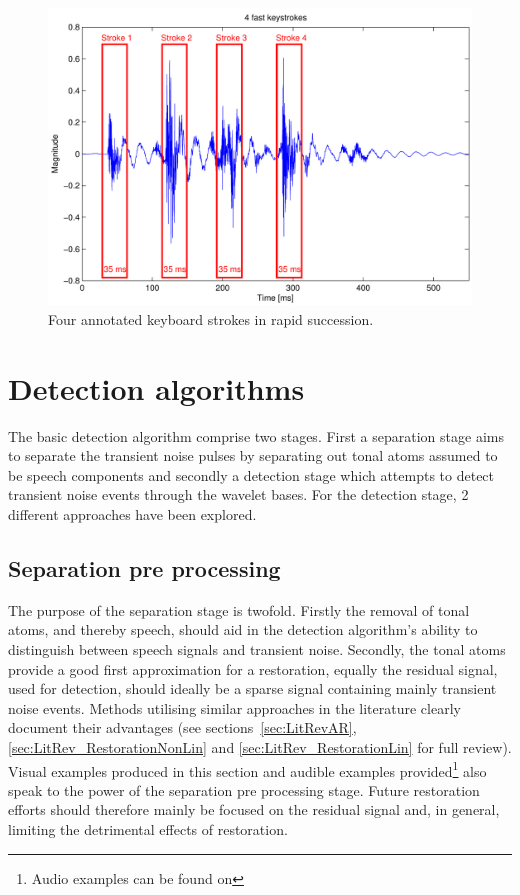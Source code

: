 \begin{figure}[!] %
\centering
\includegraphics[width=120mm]{Keyboard4StrokesFast.pdf}
\caption{Four annotated keyboard strokes in rapid succession.}\label{fig:Keyboard4StrokesFast}
\end{figure}

\section{Detection algorithms}\label{sec:WPdetection}
The basic detection algorithm comprise two stages. First a separation stage aims to separate the transient noise pulses by separating out tonal atoms assumed to be speech components and secondly a detection stage which attempts to detect transient noise events through the wavelet bases. For the detection stage, 2 different approaches have been explored.

\subsection{Separation pre processing}\label{sec:WPseparation}
The purpose of the separation stage is twofold. Firstly the removal of tonal atoms, and thereby speech, should aid in the detection algorithm's ability to distinguish between speech signals and transient noise. Secondly, the tonal atoms provide a good first approximation for a restoration, equally the residual signal, used for detection, should ideally be a sparse signal containing mainly transient noise events. Methods utilising similar approaches in the literature clearly document their advantages \cite{Godsill1998book} (see sections~\ref{sec:LitRevAR}, \ref{sec:LitRev_RestorationNonLin} and \ref{sec:LitRev_RestorationLin} for full review). Visual examples produced in this section and audible examples provided\footnote{Audio examples can be found on \siteURL} also speak to the power of the separation pre processing stage.
Future restoration efforts should therefore mainly be focused on the residual signal and, in general, limiting the detrimental effects of restoration.

